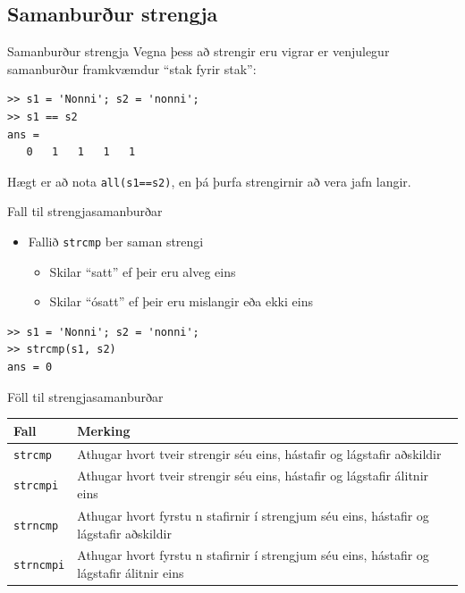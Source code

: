 \documentclass{beamer}
\begin{document}
\subsection{Samanburður strengja}

\begin{frame}[fragile]{Samanburður strengja}
Vegna þess að strengir eru vigrar er venjulegur samanburður framkvæmdur ``stak fyrir stak'':
\begin{verbatim}
>> s1 = 'Nonni'; s2 = 'nonni';
>> s1 == s2
ans =
   0   1   1   1   1
\end{verbatim}
Hægt er að nota \texttt{all(s1==s2)}, en þá þurfa strengirnir að vera jafn langir.
\end{frame}

\begin{frame}[fragile]{Fall til strengjasamanburðar}
\begin{itemize}
 \item Fallið \texttt{strcmp} ber saman strengi
 \begin{itemize}
  \item Skilar ``satt'' ef þeir eru alveg eins
  \item Skilar ``ósatt'' ef þeir eru mislangir eða ekki eins
 \end{itemize}
\end{itemize}
\begin{verbatim}
>> s1 = 'Nonni'; s2 = 'nonni';
>> strcmp(s1, s2)
ans = 0
\end{verbatim}
\end{frame}

\begin{frame}{Föll til strengjasamanburðar}
\vspace{\baselineskip}
\begin{center}
\begin{tabular}{lp{8cm}}
\toprule
Fall&Merking\\
\midrule
\texttt{strcmp}&Athugar hvort tveir strengir séu eins, hástafir og lágstafir aðskildir\\
\texttt{strcmpi}&Athugar hvort tveir strengir séu eins, hástafir og lágstafir álitnir eins\\
\texttt{strncmp}&Athugar hvort fyrstu n stafirnir í strengjum séu eins, hástafir og lágstafir aðskildir\\
\texttt{strncmpi}&Athugar hvort fyrstu n stafirnir í strengjum séu eins, hástafir og lágstafir álitnir eins\\
\bottomrule
\end{tabular}
\end{center}
\end{frame}
\end{document}

